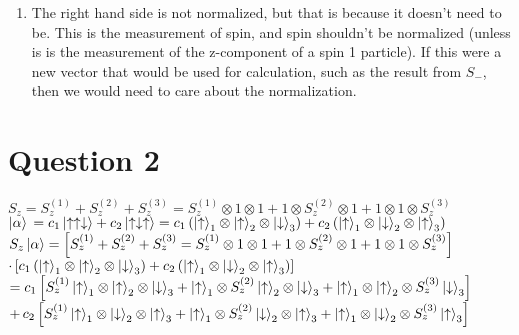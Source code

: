 \documentclass[12pt]{article}
\begin{document}
\begin{enumerate}[label=\alph*)]
\item The right hand side is not normalized, but that is because it doesn't need to be. This is the measurement of spin, and spin shouldn't be normalized (unless is is the measurement of the z-component of a spin 1 particle). If this were a new vector that would be used for calculation, such as the result from $S_-$, then we would need to care about the normalization. 
\end{enumerate}
\newpage


\section*{Question 2}
$S_z = S_z^{(1)} + S_z^{(2)} + S_z^{(3)} = S_z^{(1)}\otimes 1 \otimes 1 + 1 \otimes S_z^{(2)} \otimes 1 + 1 \otimes 1 \otimes S_z^{(3)}$\vspace{0.5em}\\
$\ket{\alpha} \, = c_1 \ket{\uparrow\uparrow\downarrow} + c_2 \ket{\uparrow\downarrow\uparrow} = c_1\left(\ket{\uparrow}_1 \otimes \ket{\uparrow}_2 \otimes \ket{\downarrow}_3\right) + c_2\left(\ket{\uparrow}_1 \otimes \ket{\downarrow}_2 \otimes \ket{\uparrow}_3\right)$\vspace{1em}\\
$S_z \ket{\alpha} = \left[S_z^{(1)} + S_z^{(2)} + S_z^{(3)} = S_z^{(1)}\otimes 1 \otimes 1 + 1 \otimes S_z^{(2)} \otimes 1 + 1 \otimes 1 \otimes S_z^{(3)}\right]$\vspace{0.5em}\\
\hspace*{5em} $\cdot\left[c_1\left(\ket{\uparrow}_1 \otimes \ket{\uparrow}_2 \otimes \ket{\downarrow}_3\right) + c_2\left(\ket{\uparrow}_1 \otimes \ket{\downarrow}_2 \otimes \ket{\uparrow}_3 \right)\right]$\vspace{0.5em}\\
\hspace*{3em}$= c_1\left[S_z^{(1)}\ket{\uparrow}_1 \otimes \ket{\uparrow}_2 \otimes \ket{\downarrow}_3 + \ket{\uparrow}_1\otimes S_z^{(2)}\ket{\uparrow}_2 \otimes \ket{\downarrow}_3 + \ket{\uparrow}_1 \otimes \ket{\uparrow}_2 \otimes S_z^{(3)}\ket{\downarrow}_3\right]$\vspace{0.5em}\\
\hspace*{5em}$+ \, c_2\left[S_z^{(1)}\ket{\uparrow}_1 \otimes \ket{\downarrow}_2 \otimes \ket{\uparrow}_3 + \ket{\uparrow}_1\otimes S_z^{(2)}\ket{\downarrow}_2 \otimes \ket{\uparrow}_3 + \ket{\uparrow}_1 \otimes \ket{\downarrow}_2 \otimes S_z^{(3)}\ket{\uparrow}_3\right]$\vspace{0.5em}\\
\end{document}
